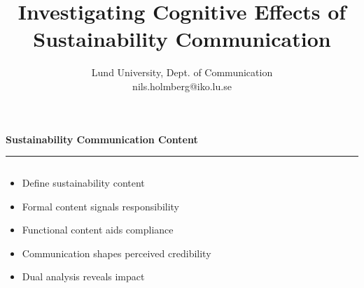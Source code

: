 \documentclass[aspectratio=169]{beamer}
\title{Investigating Cognitive Effects of Sustainability Communication}
\subtitle{Lund University, Dept. of Communication \\[0.8em]nils.holmberg@iko.lu.se}
\author{}
\newcommand{\TitleFont}{\rmfamily}
\begin{document}
\begin{frame}[plain]
  \titlepage
\end{frame}
\setcounter{framenumber}{0} %

\begin{frame}[t]{}
  \vspace*{0.5cm}
  {\TitleFont\fontsize{16}{20}\selectfont\bfseries\color{LUBronze}Sustainability Communication Content\par}
  \vspace{0.3em}
  {\color{LUBronze}\rule{\linewidth}{0.8pt}}\par
  \vspace{0.2cm}
  \begin{columns}[t]
    \begin{column}[t]{0.45\textwidth}
      \vspace*{0pt}
      \begin{itemize}\setlength\itemsep{0.65em}
        \item Define sustainability content
        \item Formal content signals responsibility
        \item Functional content aids compliance
        \item Communication shapes perceived credibility
        \item Dual analysis reveals impact
      \end{itemize}
    \end{column}
  \end{columns}
\end{frame}
\end{document}
